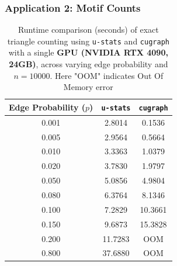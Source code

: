 \documentclass[9pt]{beamer}
\theoremstyle{mystyle}
\theoremstyle{mystyletwo}
\begin{document}
\begin{frame}
    \frametitle{Application 2: Motif Counts}
\begin{table}[htbp]
\centering
\caption{ Runtime comparison (seconds) of exact triangle counting  using \texttt{u-stats} and \texttt{cugraph} with a single \textbf{GPU (NVIDIA RTX 4090, 24GB)}, across varying edge probability and $n = 10000$. Here "OOM" indicates Out Of Memory error}
\label{tab:triangle_counting}
\begin{tabular}{c|cc}
\hline
Edge Probability ($p$) & \textbf{\texttt{u-stats}} & \textbf{\texttt{cugraph}} \\
\hline
0.001 & 2.8014 & 0.1536 \\
0.005 & 2.9564 & 0.5664 \\
0.010 & 3.3363 & 1.0379 \\
0.020 & 3.7830 & 1.9797 \\
0.050 & 5.0856 & 4.9804 \\
0.080 & 6.3764 & 8.1346 \\
0.100 & 7.2829 & 10.3661 \\
0.150 & 9.6873 & 15.3828 \\
0.200 & 11.7283 & OOM \\
0.800 & 37.6880 & OOM \\
\hline
\end{tabular} 
\end{table}


\end{frame}
\end{document}
